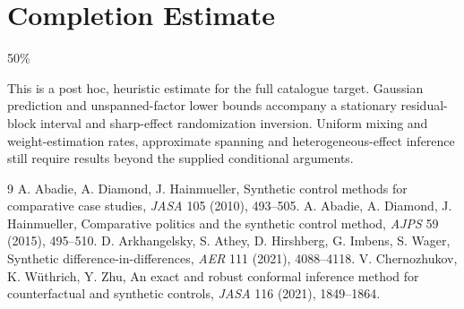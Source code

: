 \documentclass[11pt]{article}
\theoremstyle{definition}
\begin{document}
\section{Completion Estimate}
50\%

This is a post hoc, heuristic estimate for the full catalogue target.
Gaussian prediction and unspanned-factor lower bounds accompany a stationary residual-block interval and sharp-effect randomization inversion. Uniform mixing and weight-estimation rates, approximate spanning and heterogeneous-effect inference still require results beyond the supplied conditional arguments.

\begin{thebibliography}{9}
 A. Abadie, A. Diamond, J. Hainmueller, Synthetic control methods for comparative case studies, \emph{JASA} 105 (2010), 493--505.
 A. Abadie, A. Diamond, J. Hainmueller, Comparative politics and the synthetic control method, \emph{AJPS} 59 (2015), 495--510.
 D. Arkhangelsky, S. Athey, D. Hirshberg, G. Imbens, S. Wager, Synthetic difference-in-differences, \emph{AER} 111 (2021), 4088--4118.
 V. Chernozhukov, K. W\"uthrich, Y. Zhu, An exact and robust conformal inference method for counterfactual
and synthetic controls, \emph{JASA} 116 (2021), 1849--1864.
\end{thebibliography}
\end{document}
